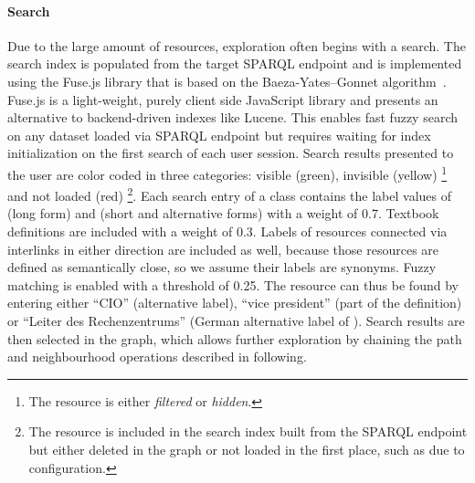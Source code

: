 \documentclass{IOS-Book-Article}     %
\begin{document}
\paragraph{Search}

Due to the large amount of resources, exploration often begins with a search.
The search index is populated from the target SPARQL endpoint and is implemented using the Fuse.js library that is based on the Baeza-Yates--Gonnet algorithm~\cite{textsearching}.
Fuse.js\footnotemark{} is a light-weight, purely client side JavaScript library and presents an alternative to backend-driven indexes like Lucene.%
This enables fast fuzzy search on any dataset loaded via SPARQL endpoint but requires waiting for index initialization on the first search of each user session.
Search results presented to the user are color coded in three categories: visible (green), invisible (yellow)%
\footnote{The resource is either \emph{filtered} or \emph{hidden}.}%
 and not loaded (red)%
\footnote{The resource is included in the search index built from the SPARQL endpoint but either deleted in the graph or not loaded in the first place, such as due to configuration.}.
Each search entry of a class contains the label values of  (long form) and  (short and alternative forms) with a weight of 0.7.
Textbook definitions are included with a weight of 0.3.
Labels of resources connected via  interlinks in either direction are included as well, because those resources are defined as semantically close, so we assume their labels are synonyms.
Fuzzy matching is enabled with a threshold of \num{0.25}.
The resource  can thus be found by entering either \enquote{CIO} (alternative label), \enquote{vice president} (part of the definition) or \enquote{Leiter des Rechenzentrums} (German alternative label of ).
Search results are then selected in the graph, which allows further exploration by chaining the path and neighbourhood operations described in following.
\end{document}
